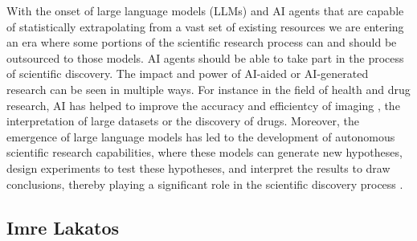With the onset of large language models (LLMs) and AI agents that are capable of statistically extrapolating from a vast set of existing resources we are entering an era where some portions of the scientific research process can and should be outsourced to those models. AI agents should be able to take part in the process of scientific discovery. The impact and power of AI-aided or AI-generated research can be seen in multiple ways. For instance in the field of health and drug research, AI has helped to improve the accuracy and efficientcy of imaging \cite{Topol2019}, the interpretation of large datasets \cite{Libbrecht2015,Kraus2019,Holzinger2019} or the discovery of drugs\cite{AlQuraishi2019}. Moreover, the emergence of large language models has led to the development of autonomous scientific research capabilities, where these models can generate new hypotheses, design experiments to test these hypotheses, and interpret the results to draw conclusions, thereby playing a significant role in the scientific discovery process \cite{EmergentAutonomous2023}.



\subsection{Imre Lakatos}

